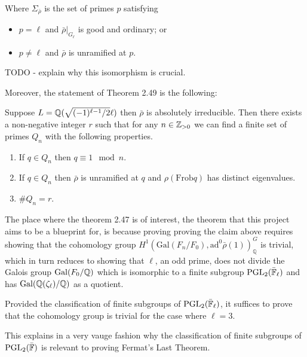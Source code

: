 Where $\Sigma_{\bar{\rho}}$ is the set of primes $p$ satisfying
    \begin{itemize}
        \item $p = \ell$ and $\bar{\rho}|_{G_{\ell}}$ is good and ordinary; or
        \item $p \ne \ell$ and $\bar{\rho}$ is unramified at $p$.
    \end{itemize}

TODO - explain why this isomorphism is crucial.

Moreover, the statement of Theorem 2.49 is the following:

\begin{theorem}[Theorem 2.49]
    Suppose $L = \mathbb{Q}(\sqrt{(-1)^{\ell -1}/2} \ell)$ then $\bar{\rho}$ is absolutely irreducible. Then
    there exists a non-negative integer $r$ such that for any $n \in \mathbb{Z}_{>0}$ we can find a
    finite set of primes $Q_n$ with the following properties.
    \begin{enumerate}
        \item If $q \in Q_n$ then $q \equiv 1 \mod n$.
        \item If $q \in Q_n$ then $\bar{\rho}$ is unramified at $q$ and $\rho(\textrm{Frob}q)$ has distinct eigenvalues.
        \item $\# Q_n = r$.
    \end{enumerate}
\end{theorem}

The place where the theorem 2.47 is of interest, the theorem that this project aims to be a blueprint for, is because proving proving the claim above requires showing that the 
cohomology group  $H^1(\textrm{Gal}(F_n / F_0), \textrm{ad}^0\bar{\rho}(1))^G_{\mathbb{Q}}$ is trivial, which in turn reduces to showing that $\ell$, an odd prime, does not divide the Galois group $\operatorname{Gal}(F_0 /\mathbb{Q})$ which is isomorphic to a finite subgroup $\operatorname{PGL}_2(\bar{\mathbb{F}}_\ell)$
and has $\operatorname{Gal}(\mathbb{Q}(\zeta_\ell)/\mathbb{Q})$ as a quotient.

Provided the classification of finite subgroups of $\operatorname{PGL}_2(\bar{\mathbb{F}}_\ell)$, it suffices to prove that the cohomology group is trivial for the case where $\ell = 3$.

This explains in a very vauge fashion why the classification of finite subgroups of $\operatorname{PGL}_2(\bar{\mathbb{F}})$ is relevant to proving Fermat's Last Theorem.




